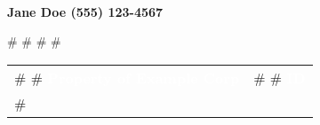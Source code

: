 \documentclass[11pt]{article}
\begin{document}
{\begin{minipage}[c][80mm][c]{79mm}
\begin{minipage}[t]{79mm}
      \vspace{3mm}
      
      \colorbox{lightpastelpurple}{%
        \begin{minipage}[c][4mm][c]{77mm}
          \centering
        \end{minipage}
      }\\[1mm]
      
      {\small
      \textbf{Jane Doe (555) 123-4567}
      }
      
      \vspace{5mm}
      
    #   %
    #   \hspace{-1.2em}
    #   \renewcommand{\arraystretch}{1.5}
    #   \begin{tabular}{p{7.5cm}p{3.1cm}}
        # \cellcolor{darkheader}      
        # \textcolor{white}{{\textbf{\small Property of Example Corp}}}  & 
        # \cellcolor{lightpastelpurple}  
        # \textcolor{white}{{\textbf{\small ID}}} \\
    #   \end{tabular}
    \end{minipage}
  \end{minipage}
}
\vspace*{\fill}
\end{document}
